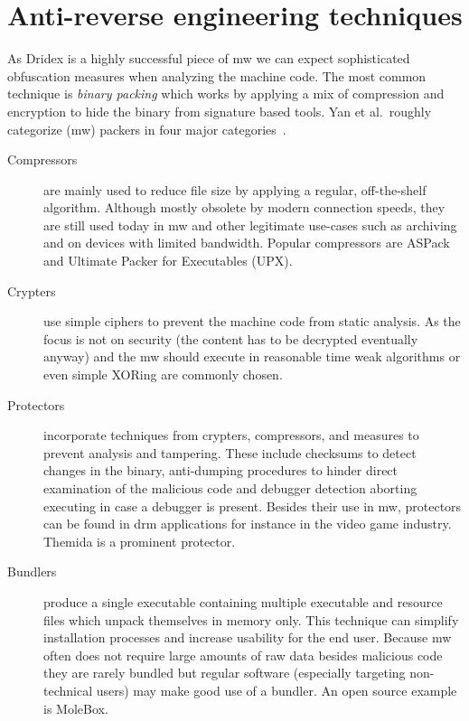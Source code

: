 \section{Anti-reverse engineering techniques\label{sec:Related_work::Anti_reverse_engineering_techniques}}
As Dridex is a highly successful piece of \gls{mw} we can expect sophisticated obfuscation measures when analyzing the machine code.
The most common technique is \emph{binary packing} which works by applying a mix of compression and encryption to hide the binary from signature based tools.
Yan et al.\ roughly categorize (\gls{mw}) packers in four major categories~\cite{yan2008revealing}.

\begin{description}
    \item[Compressors] are mainly used to reduce file size by applying a regular, off-the-shelf algorithm.
    Although mostly obsolete by modern connection speeds, they are still used today in \gls{mw} and other legitimate use-cases such as archiving and on devices with limited bandwidth.
    Popular compressors are ASPack and Ultimate Packer for Executables (UPX).
    \item[Crypters] use simple ciphers to prevent the machine code from static analysis.
    As the focus is not on security (the content has to be decrypted eventually anyway) and the \gls{mw} should execute in reasonable time weak algorithms or even simple XORing are commonly chosen.
    \item[Protectors] incorporate techniques from crypters, compressors, and measures to prevent analysis and tampering.
    These include checksums to detect changes in the binary, anti-dumping procedures to hinder direct examination of the malicious code and debugger detection aborting executing in case a debugger is present.
    Besides their use in \gls{mw}, protectors can be found in \gls{drm} applications for instance in the video game industry.
    Themida is a prominent protector.
    \item[Bundlers] produce a single executable containing multiple executable and resource files which unpack themselves in memory only.
    This technique can simplify installation processes and increase usability for the end user.
    Because \gls{mw} often does not require large amounts of raw data besides malicious code they are rarely bundled but regular software (especially targeting non-technical users) may make good use of a bundler.
    An open source example is MoleBox.
\end{description}

